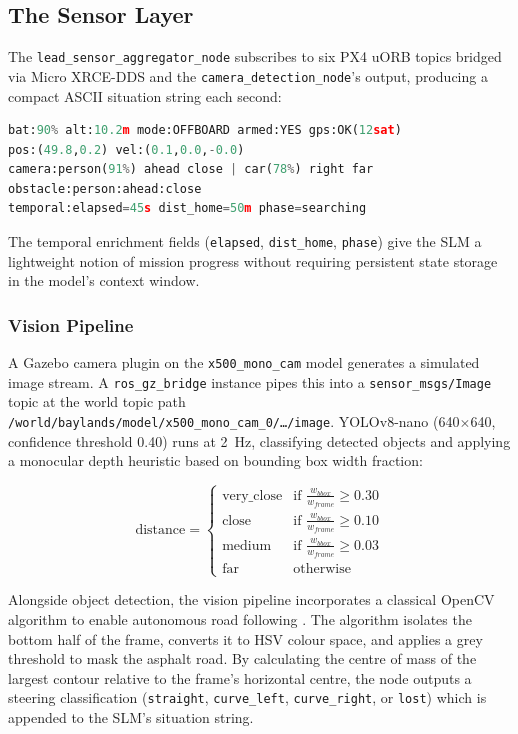 \documentclass[conference]{IEEEtran}
\begin{document}
\subsection{The Sensor Layer}

The \texttt{lead\_sensor\_aggregator\_node} subscribes to six PX4 uORB topics bridged via Micro XRCE-DDS and the \texttt{camera\_detection\_node}'s output, producing a compact ASCII situation string each second:

\begin{lstlisting}[language=Python, caption={Situation string format injected into SLM context each cycle.}]
bat:90% alt:10.2m mode:OFFBOARD armed:YES gps:OK(12sat)
pos:(49.8,0.2) vel:(0.1,0.0,-0.0)
camera:person(91%) ahead close | car(78%) right far
obstacle:person:ahead:close
temporal:elapsed=45s dist_home=50m phase=searching
\end{lstlisting}

The temporal enrichment fields (\texttt{elapsed}, \texttt{dist\_home}, \texttt{phase}) give the SLM a lightweight notion of mission progress without requiring persistent state storage in the model's context window.

\subsubsection{Vision Pipeline}

A Gazebo camera plugin on the \texttt{x500\_mono\_cam} model generates a simulated image stream. A \texttt{ros\_gz\_bridge} instance pipes this into a \texttt{sensor\_msgs/Image} topic at the world topic path \texttt{/world/baylands/model/x500\_mono\_cam\_0/\ldots/image}. YOLOv8-nano (640$\times$640, confidence threshold 0.40) runs at 2~Hz, classifying detected objects and applying a monocular depth heuristic based on bounding box width fraction:

\begin{equation}
\text{distance} = \begin{cases} \text{very\_close} & \text{if } \frac{w_{bbox}}{w_{frame}} \geq 0.30 \\ \text{close} & \text{if } \frac{w_{bbox}}{w_{frame}} \geq 0.10 \\ \text{medium} & \text{if } \frac{w_{bbox}}{w_{frame}} \geq 0.03 \\ \text{far} & \text{otherwise} \end{cases}
\label{eq:dist}
\end{equation}

Alongside object detection, the vision pipeline incorporates a classical OpenCV algorithm to enable autonomous road following \cite{ref_opencv_uav}. The algorithm isolates the bottom half of the frame, converts it to HSV colour space, and applies a grey threshold to mask the asphalt road. By calculating the centre of mass of the largest contour relative to the frame's horizontal centre, the node outputs a steering classification (\texttt{straight}, \texttt{curve\_left}, \texttt{curve\_right}, or \texttt{lost}) which is appended to the SLM's situation string.
\end{document}
